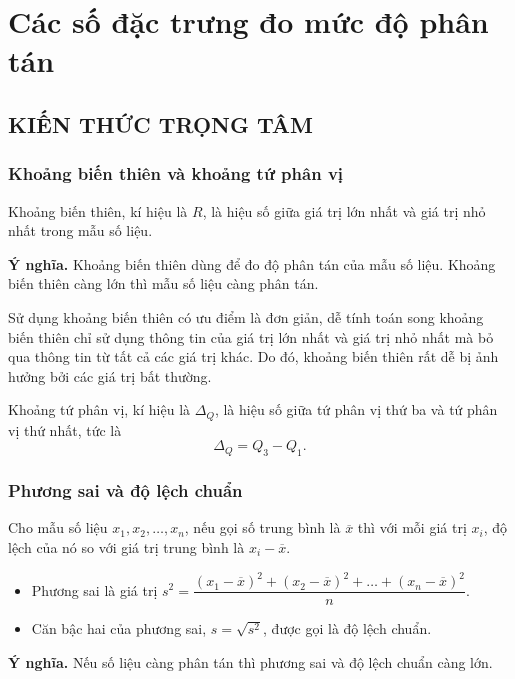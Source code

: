 \newpage\setcounter{dang}{0}
\section{Các số đặc trưng đo mức độ phân tán}
\subsection{KIẾN THỨC TRỌNG TÂM}
\subsubsection{Khoảng biến thiên và khoảng tứ phân vị}
\begin{boxdn}
	Khoảng biến thiên, kí hiệu là $R$, là hiệu số giữa giá trị lớn nhất và giá trị nhỏ nhất trong mẫu số liệu.
\end{boxdn}
\textbf{Ý nghĩa.} Khoảng biến thiên dùng để đo độ phân tán của mẫu số liệu. Khoảng biến thiên càng lớn thì mẫu số liệu càng phân tán.
\begin{nx}
Sử dụng khoảng biến thiên có ưu điểm là đơn giản, dễ tính toán song khoảng biến thiên chỉ sử dụng thông tin của giá trị lớn nhất và giá trị nhỏ nhất mà bỏ qua thông tin từ tất cả các giá trị khác. Do đó, khoảng biến thiên rất dễ bị ảnh hưởng bởi các giá trị bất thường.
\end{nx}
\begin{boxdn}
	Khoảng tứ phân vị, kí hiệu là $\Delta_Q$, là hiệu số giữa tứ phân vị thứ ba và tứ phân vị thứ nhất, tức là $$\Delta_Q = Q_3 - Q_1.$$
\end{boxdn}
\subsubsection{Phương sai và độ lệch chuẩn}
\begin{boxdn}
	Cho mẫu số liệu $x_1, x_2, \dots, x_n$, nếu gọi số trung bình là $\overline{x}$ thì với mỗi giá trị $x_i$, độ lệch của nó so với giá trị trung bình là $x_i - \overline{x}$.
		\begin{itemize}
			\item Phương sai là giá trị
			$s^2 = \dfrac{(x_1 - \overline{x})^2 + (x_2 - \overline{x})^2 + \dots + (x_n - \overline{x})^2}{n}$.
			\item Căn bậc hai của phương sai, $s = \sqrt{s^2}$, được gọi là độ lệch chuẩn.
		\end{itemize}
\end{boxdn}
\textbf{Ý nghĩa.} Nếu số liệu càng phân tán thì phương sai và độ lệch chuẩn càng lớn.
